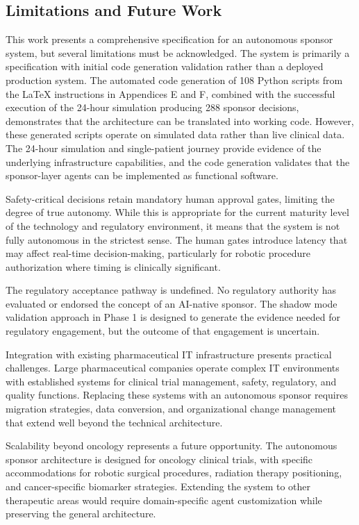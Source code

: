 \subsection{Limitations and Future Work}

This work presents a comprehensive specification for an autonomous sponsor system, but
several limitations must be acknowledged. The system is primarily a specification with
initial code generation validation rather than a deployed production system. The automated
code generation of 108 Python scripts from the LaTeX instructions in Appendices E and F,
combined with the successful execution of the 24-hour simulation producing 288 sponsor
decisions, demonstrates that the architecture can be translated into working code. However,
these generated scripts operate on simulated data rather than live clinical data. The
24-hour simulation \cite{main-repo} and single-patient journey \cite{patient-journey-paper}
provide evidence of the underlying infrastructure capabilities, and the code generation
validates that the sponsor-layer agents can be implemented as functional software.

Safety-critical decisions retain mandatory human approval gates, limiting the degree of
true autonomy. While this is appropriate for the current maturity level of the technology
and regulatory environment, it means that the system is not fully autonomous in the
strictest sense. The human gates introduce latency that may affect real-time decision-making,
particularly for robotic procedure authorization where timing is clinically significant.

The regulatory acceptance pathway is undefined. No regulatory authority has evaluated or
endorsed the concept of an AI-native sponsor. The shadow mode validation approach in
Phase 1 is designed to generate the evidence needed for regulatory engagement, but the
outcome of that engagement is uncertain.

Integration with existing pharmaceutical IT infrastructure presents practical challenges.
Large pharmaceutical companies operate complex IT environments with established systems
for clinical trial management, safety, regulatory, and quality functions. Replacing these
systems with an autonomous sponsor requires migration strategies, data conversion, and
organizational change management that extend well beyond the technical architecture.

Scalability beyond oncology represents a future opportunity. The autonomous sponsor
architecture is designed for oncology clinical trials, with specific accommodations for
robotic surgical procedures, radiation therapy positioning, and cancer-specific biomarker
strategies. Extending the system to other therapeutic areas would require domain-specific
agent customization while preserving the general architecture.


